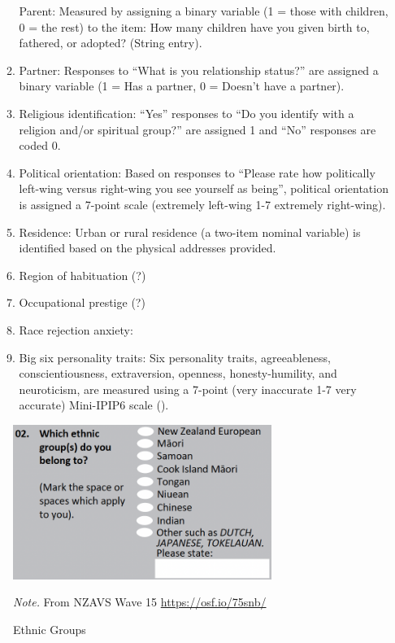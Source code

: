 \documentclass[
  man,
  longtable,
  nolmodern,
  notxfonts,
  notimes,
  colorlinks=true,linkcolor=blue,citecolor=blue,urlcolor=blue]{apa7}
\begin{document}
\begin{itemize}
\begin{enumerate}
    Parent: Measured by assigning a binary variable (1 = those with
    children, 0 = the rest) to the item: How many children have you
    given birth to, fathered, or adopted? (String entry).
  \item
    Partner: Responses to ``What is you relationship status?'' are
    assigned a binary variable (1 = Has a partner, 0 = Doesn't have a
    partner).
  \item
    Religious identification: ``Yes'' responses to ``Do you identify
    with a religion and/or spiritual group?'' are assigned 1 and ``No''
    responses are coded 0.
  \item
    Political orientation: Based on responses to ``Please rate how
    politically left-wing versus right-wing you see yourself as being'',
    political orientation is assigned a 7-point scale (extremely
    left-wing 1-7 extremely right-wing).
  \item
    Residence: Urban or rural residence (a two-item nominal variable) is
    identified based on the physical addresses provided.
  \item
    Region of habituation (?)
  \item
    Occupational prestige (?)
  \item
    Race rejection anxiety:
  \item
    Big six personality traits: Six personality traits, agreeableness,
    conscientiousness, extraversion, openness, honesty-humility, and
    neuroticism, are measured using a 7-point (very inaccurate 1-7 very
    accurate) Mini-IPIP6 scale ().
  \end{enumerate}
\end{itemize}

\begin{figure}[!htbp]

{\caption{{Ethnic Groups}{\label{fig-ethnicgroups}}}}

\includegraphics[width=0.75\textwidth,height=\textheight]{figs/ethnic-groups.png}

{\noindent \emph{Note.} From NZAVS Wave 15 \url{https://osf.io/75snb/}}

\end{figure}
\end{document}
